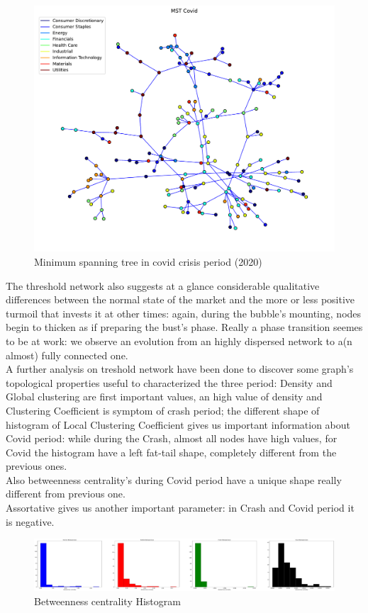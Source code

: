 \documentclass[sigchi]{acmart}
\begin{document}
\begin{figure}[H]
	\centering
	\includegraphics[width=\linewidth]{MST Covid.pdf}
	\caption{Minimum spanning tree in covid crisis period (2020)}
\end{figure}
The threshold network also suggests at a glance considerable qualitative differences between the normal state of the market and the more or less positive turmoil that invests it at other times: again, during the bubble's mounting, nodes begin to thicken as if preparing the bust's phase. Really a phase transition seemes to be at work: we observe an evolution from an highly dispersed network to a(n almost) fully connected one.\\
A further analysis on treshold network have been done to discover some graph's topological properties useful to characterized the three period:  Density and Global clustering are  first important values, an high value of density and Clustering Coefficient is symptom of crash period; the different shape of histogram of Local Clustering Coefficient gives us important information about Covid period: while during the Crash, almost all nodes have high values, for Covid the histogram have a left fat-tail shape, completely different from the previous ones.\\
Also betweenness centrality's during Covid period have a unique shape really different from previous one.\\
Assortative gives us another important parameter: in Crash and Covid period it is negative.
\begin{figure}[H]
	\centering
	\includegraphics[width=\linewidth]{distribution_betweenness.pdf}
	\caption{Betweenness centrality Histogram}
\end{figure}
\end{document}
